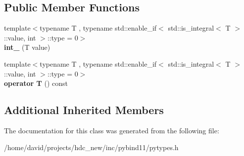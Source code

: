 \subsection*{Public Member Functions}
\begin{DoxyCompactItemize}
\item 
{\footnotesize template$<$typename T , typename std\+::enable\+\_\+if$<$ std\+::is\+\_\+integral$<$ T $>$\+::value, int $>$\+::type  = 0$>$ }\\{\bfseries int\+\_\+} (T value)\hypertarget{classint___a9ec72c4afa30290e22b7ce250b6e537c}{}\label{classint___a9ec72c4afa30290e22b7ce250b6e537c}

\item 
{\footnotesize template$<$typename T , typename std\+::enable\+\_\+if$<$ std\+::is\+\_\+integral$<$ T $>$\+::value, int $>$\+::type  = 0$>$ }\\{\bfseries operator T} () const \hypertarget{classint___a9c3de80dfe6429c415bd2384702ce046}{}\label{classint___a9c3de80dfe6429c415bd2384702ce046}

\end{DoxyCompactItemize}
\subsection*{Additional Inherited Members}


The documentation for this class was generated from the following file\+:\begin{DoxyCompactItemize}
\item 
/home/david/projects/hdc\+\_\+new/inc/pybind11/pytypes.\+h\end{DoxyCompactItemize}
